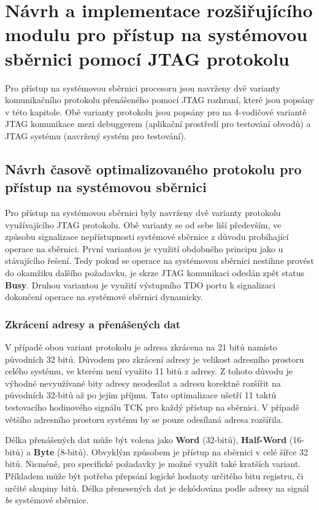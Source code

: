 \chapter{Návrh a implementace rozšiřujícího modulu pro přístup na systémovou sběrnici pomocí JTAG protokolu}	\label{jtag_ap}
Pro přístup na systémovou sběrnici procesoru jsou navrženy dvě varianty komunikačního protokolu přenášeného pomocí JTAG rozhraní, které jsou popsány v této kapitole. Obě varianty protokolu jsou popsány pro na 4-vodičové variantě \acs{JTAG} komunikace mezi debuggerem (aplikační prostředí pro testování obvodů) a \acs{JTAG} systému (navržený systém pro testování).



\section{Návrh časově optimalizovaného protokolu pro přístup na systémovou sběrnici}	\label{sec:protokoly}
Pro přístup na systémovou sběrnici byly navrženy dvě varianty protokolu využívajícího JTAG protokolu. Obě varianty se od sebe liší především, ve způsobu signalizace nepřístupnosti systémové sběrnice z důvodu probíhající operace na sběrnici. První variantou je využití obdobného principu jako u stávajícího řešení. Tedy pokud se operace na systémovou sběrnici nestihne provést do okamžiku dalšího požadavku, je skrze JTAG komunikaci odeslán zpět status \textbf{Busy}. Druhou variantou je využití výstupního \acs{TDO} portu k signalizaci dokončení operace na systémové sběrnici dynamicky.

\subsection{Zkrácení adresy a přenášených dat}
V případě obou variant protokolu je adresa zkrácena na 21 bitů namísto původních 32 bitů. Důvodem pro zkrácení adresy je velikost adresního prostoru celého systému, ve kterém není využito 11 bitů z adresy. Z tohoto důvodu je výhodné nevyužívané bity adresy neodesílat a adresu korektně rozšířit na původních 32-bitů až po jejím příjmu. Tato optimalizace ušetří 11 taktů testovacího hodinového signálu \acs{TCK} pro každý přístup na sběrnici. V případě většího adresního prostoru systému by se pouze odesílaná adresa rozšířila.

Délka přenášených dat může být volena jako \textbf{Word} (32-bitů), \textbf{Half-Word} (16-bitů) a \textbf{Byte} (8-bitů). Obvyklým způsobem je přístup na sběrnici v celé šířce 32 bitů. Nicméně, pro specifické požadavky je možné využít také kratších variant. Příkladem může být potřeba přepsání logické hodnoty určitého bitu registru, či určité skupiny bitů. Délka přenesených dat je dekódována podle adresy na signál \textit{be} systémové sběrnice.

